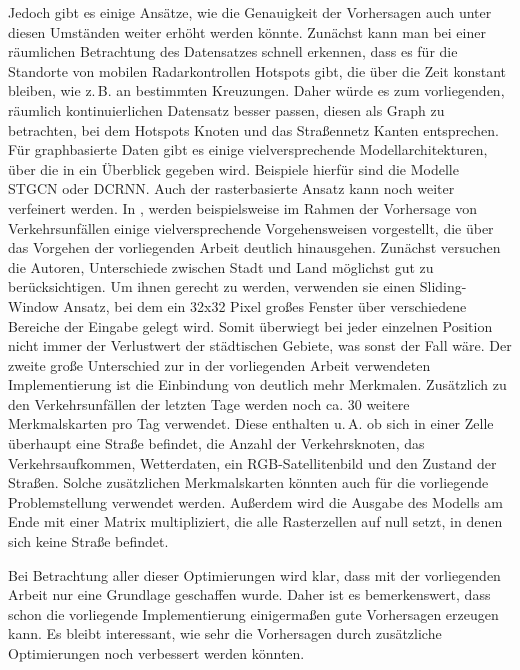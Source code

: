 Jedoch gibt es einige Ansätze, wie die Genauigkeit der Vorhersagen auch unter diesen Umständen weiter erhöht werden könnte.
Zunächst kann man bei einer räumlichen Betrachtung des Datensatzes schnell erkennen, dass es für die Standorte von mobilen Radarkontrollen Hotspots gibt, die über die Zeit konstant bleiben, wie z.\,B. an bestimmten Kreuzungen.
Daher würde es zum vorliegenden, räumlich kontinuierlichen Datensatz besser passen, diesen als Graph zu betrachten, bei dem Hotspots Knoten und das Straßennetz Kanten entsprechen.
Für graphbasierte Daten gibt es einige vielversprechende Modellarchitekturen, über die in \cite{DLTraff} ein Überblick gegeben wird.
Beispiele hierfür sind die Modelle STGCN oder DCRNN.
Auch der rasterbasierte Ansatz kann noch weiter verfeinert werden.
In \cite{HeteroConvLSTM}, werden beispielsweise im Rahmen der Vorhersage von Verkehrsunfällen einige vielversprechende Vorgehensweisen vorgestellt, die über das Vorgehen der vorliegenden Arbeit deutlich hinausgehen.
Zunächst versuchen die Autoren, Unterschiede zwischen Stadt und Land möglichst gut zu berücksichtigen.
Um ihnen gerecht zu werden, verwenden sie einen Sliding-Window Ansatz, bei dem ein 32x32 Pixel großes Fenster über verschiedene Bereiche der Eingabe gelegt wird.
Somit überwiegt bei jeder einzelnen Position nicht immer der Verlustwert der städtischen Gebiete, was sonst der Fall wäre.
Der zweite große Unterschied zur in der vorliegenden Arbeit verwendeten Implementierung ist die Einbindung von deutlich mehr Merkmalen.
Zusätzlich zu den Verkehrsunfällen der letzten Tage werden noch ca. 30 weitere Merkmalskarten pro Tag verwendet.
Diese enthalten u.\,A. ob sich in einer Zelle überhaupt eine Straße befindet, die Anzahl der Verkehrsknoten, das Verkehrsaufkommen, Wetterdaten, ein RGB-Satellitenbild und den Zustand der Straßen.
Solche zusätzlichen Merkmalskarten könnten auch für die vorliegende Problemstellung verwendet werden.
Außerdem wird die Ausgabe des Modells am Ende mit einer Matrix multipliziert, die alle Rasterzellen auf null setzt, in denen sich keine Straße befindet.

Bei Betrachtung aller dieser Optimierungen wird klar, dass mit der vorliegenden Arbeit nur eine Grundlage geschaffen wurde.
Daher ist es bemerkenswert, dass schon die vorliegende Implementierung einigermaßen gute Vorhersagen erzeugen kann.
Es bleibt interessant, wie sehr die Vorhersagen durch zusätzliche Optimierungen noch verbessert werden könnten.
